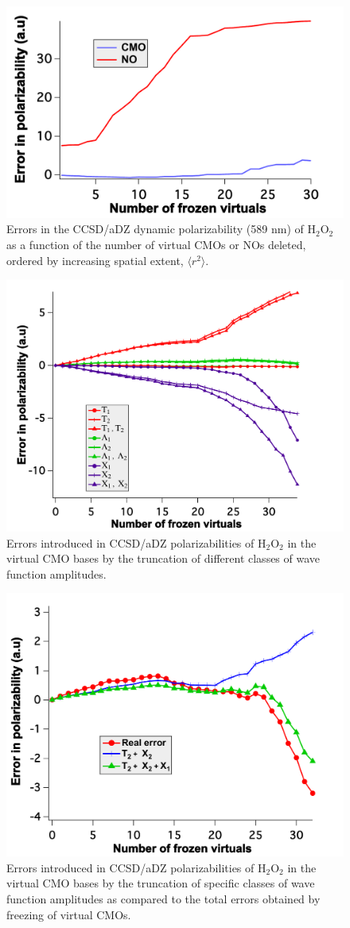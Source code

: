\begin{figure}
  \centering
  \includegraphics[width=0.6\linewidth]{figures/sort_spatial.pdf}
  \caption{Errors in the CCSD/aDZ dynamic polarizability (589
nm) of H$_2$O$_2$ as a function of the number of virtual CMOs or NOs deleted,
ordered by increasing spatial extent, $\langle r^2 \rangle$.}
   \label{fig:sort_spatial}
\end{figure}
\begin{figure}
  \centering
  \includegraphics[width=0.6\linewidth]{figures/amp_trunc_cmo.pdf}
  \caption{Errors introduced in CCSD/aDZ polarizabilities of
H$_2$O$_2$ in the virtual CMO bases by the truncation of different classes of wave
function amplitudes.}
   \label{fig:amp_trunc_cmo}
\end{figure}
\begin{figure}
  \centering
  \includegraphics[width=0.6\linewidth]{figures/error_cmpare.pdf}
  \caption{Errors introduced in CCSD/aDZ polarizabilities of
H$_2$O$_2$ in the virtual CMO bases by the truncation of specific classes of wave
function amplitudes as compared to the total errors obtained by freezing of
virtual CMOs.}
   \label{fig:error_compare}
\end{figure}
